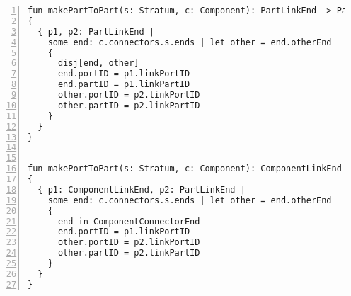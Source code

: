 \begin{lstlisting}[caption={inference\_help.als}, numbers=left]
fun makePartToPart(s: Stratum, c: Component): PartLinkEnd -> PartLinkEnd
{
  { p1, p2: PartLinkEnd |
    some end: c.connectors.s.ends | let other = end.otherEnd
    {
      disj[end, other]
      end.portID = p1.linkPortID
      end.partID = p1.linkPartID
      other.portID = p2.linkPortID
      other.partID = p2.linkPartID
    }  
  }
}


fun makePortToPart(s: Stratum, c: Component): ComponentLinkEnd -> PartLinkEnd
{
  { p1: ComponentLinkEnd, p2: PartLinkEnd |
    some end: c.connectors.s.ends | let other = end.otherEnd
    {
      end in ComponentConnectorEnd
      end.portID = p1.linkPortID
      other.portID = p2.linkPortID
      other.partID = p2.linkPartID
    }  
  }
}

\end{lstlisting}